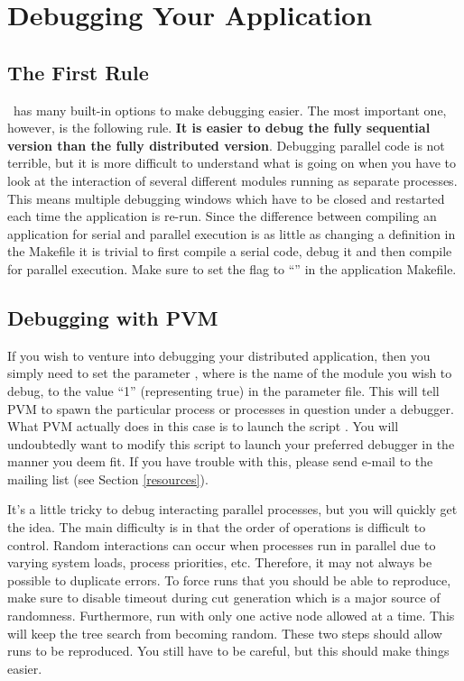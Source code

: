 \section{Debugging Your Application}

\subsection{The First Rule}

\BB\ has many built-in options to make debugging easier. The most
important one, however, is the following rule. {\bf It is easier to
debug the fully sequential version than the fully distributed
version}. Debugging parallel code is not terrible, but it is more
difficult to understand what is going on when you have to look at the
interaction of several different modules running as separate
processes. This means multiple debugging windows which have to be
closed and restarted each time the application is re-run. Since the difference
between compiling an application for serial and parallel execution is as
little as changing a definition in the Makefile it is trivial to first compile
a serial code, debug it and then compile for parallel execution.
Make sure to set the  flag to
``'' in the application Makefile.

\subsection{Debugging with PVM}
\label{debugging-PVM}
If you wish to venture into debugging your distributed application,
then you simply need to set the parameter , where 
 is the name of the module you wish to debug, 
to the value ``1'' (representing true) in the parameter file. 
This will tell PVM to spawn the particular process or
processes in question under a debugger. What PVM actually does in this
case is to launch the script . You will
undoubtedly want to modify this script to launch your preferred
debugger in the manner you deem fit. If you have trouble with this,
please send e-mail to the mailing list (see Section \ref{resources}).

It's a little tricky to debug interacting parallel processes, but you
will quickly get the idea. The main difficulty is in that the order of
operations is difficult to control. Random interactions can occur when
processes run in parallel due to varying system loads, process
priorities, etc. Therefore, it may not always be possible to duplicate
errors. To force runs that you should be able to reproduce, make sure
to disable timeout during cut generation which is a major source of
randomness. Furthermore, 
run with only one active node allowed at a time. This will keep the tree
search from becoming random. These two steps should allow runs to be
reproduced. You still have to be careful, but this should make things easier.

